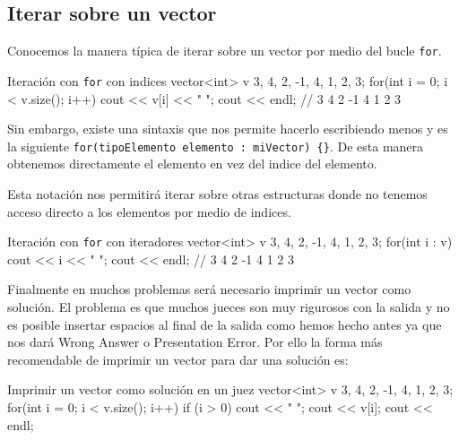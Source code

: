 \documentclass{article}
\begin{document}
    \subsection{Iterar sobre un vector}
    Conocemos la manera típica de iterar sobre un vector por medio del bucle \texttt{for}.
    \begin{codelisting}{Iteración con \texttt{for} con indices}
vector<int> v {3, 4, 2, -1, 4, 1, 2, 3};
for(int i = 0; i < v.size(); i++) {
    cout << v[i] << " ";
} 
cout << endl; // 3 4 2 -1 4 1 2 3
    \end{codelisting}

    Sin embargo, existe una sintaxis que nos permite hacerlo escribiendo menos y es la siguiente
    \texttt{for(tipoElemento elemento : miVector) \{\}}. De esta manera obtenemos directamente el elemento
    en vez del indice del elemento.
    
    Esta notación nos permitirá iterar sobre otras estructuras donde
    no tenemos acceso directo a los elementos por medio de indices. 

    \begin{codelisting}{Iteración con \texttt{for} con iteradores}
vector<int> v {3, 4, 2, -1, 4, 1, 2, 3};
for(int i : v) {
    cout << i << " ";
} 
cout << endl; // 3 4 2 -1 4 1 2 3
    \end{codelisting}

    Finalmente en muchos problemas será necesario imprimir un vector como solución. El problema es que
    muchos jueces son muy rigurosos con la salida y no es posible insertar espacios al final de la salida
    como hemos hecho antes ya que nos dará Wrong Answer o Presentation Error. Por ello la forma más recomendable
    de imprimir un vector para dar una solución es:

    \begin{codelisting}{Imprimir un vector como solución en un juez}
vector<int> v {3, 4, 2, -1, 4, 1, 2, 3};
for(int i = 0; i < v.size(); i++) {
    if (i > 0) cout << " ";
    cout << v[i];
}
cout << endl;
    \end{codelisting}
\end{document}
